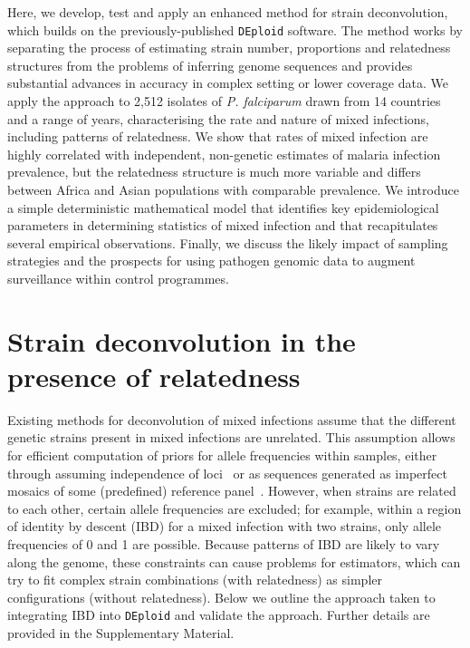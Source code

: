 \documentclass[9pt,lineno]{elife}
\begin{document}
Here, we develop, test and apply an enhanced method for strain deconvolution, which builds on the previously-published \texttt{DEploid} software.  The method works by separating the process of estimating strain number, proportions and relatedness structures from the problems of inferring genome sequences and provides substantial advances in accuracy in complex setting or lower coverage data.  We apply the approach to 2,512 isolates of {\it P. falciparum} drawn from 14 countries and a range of years, characterising the rate and nature of mixed infections, including patterns of relatedness.  We show that rates of mixed infection are highly correlated with independent, non-genetic estimates of malaria infection prevalence, but the relatedness structure is much more variable and differs between Africa and Asian populations with comparable prevalence.  We introduce a simple deterministic mathematical model that identifies key epidemiological parameters in determining statistics of mixed infection and that recapitulates several empirical observations.  Finally, we discuss the likely impact of sampling strategies and the prospects for using pathogen genomic data to augment surveillance within control programmes.



\section{Strain deconvolution in the presence of relatedness}

Existing methods for deconvolution of mixed infections assume that the different genetic strains present in mixed infections are unrelated.  This assumption allows for efficient computation of priors for allele frequencies within samples, either through assuming independence of loci~\citep{Jack2016} or as sequences generated as imperfect mosaics of some (predefined) reference panel~\citep{Zhu2017}.  However, when strains are related to each other, certain allele frequencies are excluded; for example, within a region of identity by descent (IBD) for a mixed infection with two strains, only allele frequencies of 0 and 1 are possible.  Because patterns of IBD are likely to vary along the genome, these constraints can cause problems for estimators, which can try to fit complex strain combinations (with relatedness) as simpler configurations (without relatedness).  Below we outline the approach taken to integrating IBD into \texttt{DEploid} and validate the approach.  Further details are provided in the Supplementary Material.
\end{document}
